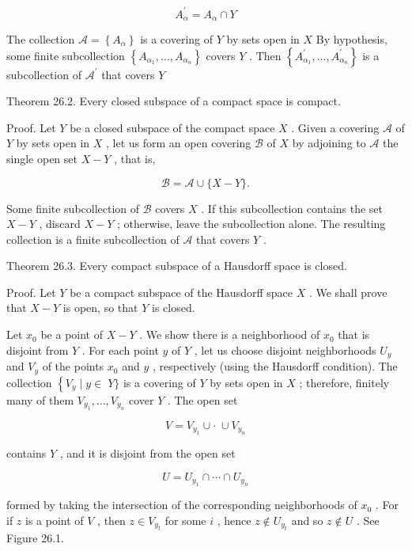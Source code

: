 \documentclass[10pt]{article}
\begin{document}
\[
{A}_{\alpha }^{\prime } = {A}_{\alpha } \cap  Y
\]

The collection \(\mathcal{A} = \left\{  {A}_{\alpha }\right\}\) is a covering of \(Y\) by sets open in \(X\) By hypothesis, some finite subcollection \(\left\{  {{A}_{{\alpha }_{1}},\ldots ,{A}_{{\alpha }_{n}}}\right\}\) covers \(Y\) . Then \(\left\{  {{A}_{{\alpha }_{1}}^{\prime },\ldots ,{A}_{{\alpha }_{n}}^{\prime }}\right\}\) is a subcollection of \({\mathcal{A}}^{\prime }\) that covers \(Y\)

Theorem 26.2. Every closed subspace of a compact space is compact.

Proof. Let \(Y\) be a closed subspace of the compact space \(X\) . Given a covering \(\mathcal{A}\) of \(Y\) by sets open in \(X\) , let us form an open covering \(\mathcal{B}\) of \(X\) by adjoining to \(\mathcal{A}\) the single open set \(X - Y\) , that is,

\[
\mathcal{B} = \mathcal{A} \cup  \{ X - Y\} .
\]

Some finite subcollection of \(\mathcal{B}\) covers \(X\) . If this subcollection contains the set \(X - Y\) , discard \(X - Y\) ; otherwise, leave the subcollection alone. The resulting collection is a finite subcollection of \(\mathcal{A}\) that covers \(Y\) .

Theorem 26.3. Every compact subspace of a Hausdorff space is closed.

Proof. Let \(Y\) be a compact subspace of the Hausdorff space \(X\) . We shall prove that \(X - Y\) is open, so that \(Y\) is closed.

Let \({x}_{0}\) be a point of \(X - Y\) . We show there is a neighborhood of \({x}_{0}\) that is disjoint from \(Y\) . For each point \(y\) of \(Y\) , let us choose disjoint neighborhoods \({U}_{y}\) and \({V}_{y}\) of the points \({x}_{0}\) and \(y\) , respectively (using the Hausdorff condition). The collection \(\left\{  {{V}_{y} \mid  y \in  }\right. \; Y\}\) is a covering of \(Y\) by sets open in \(X\) ; therefore, finitely many of them \({V}_{{y}_{1}},\ldots ,{V}_{{y}_{n}}\) cover \(Y\) . The open set

\[
V = {V}_{{y}_{1}} \cup   \cdot  \; \cup  {V}_{{y}_{n}}
\]

contains \(Y\) , and it is disjoint from the open set

\[
U = {U}_{{y}_{1}} \cap  \cdots  \cap  {U}_{{y}_{n}}
\]

formed by taking the intersection of the corresponding neighborhoods of \({x}_{0}\) . For if \(z\) is a point of \(V\) , then \(z \in  {V}_{{y}_{t}}\) for some \(i\) , hence \(z \notin  {U}_{{y}_{t}}\) and so \(z \notin  U\) . See Figure 26.1.
\end{document}

